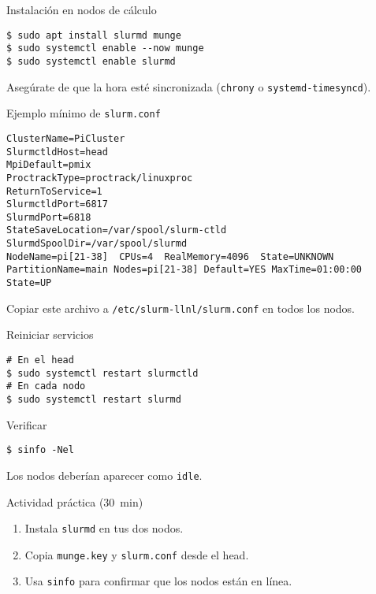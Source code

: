 \documentclass[aspectratio=169,professionalfonts]{beamer}
\begin{document}
\begin{frame}[fragile]{Instalación en nodos de cálculo}
  \begin{verbatim}
$ sudo apt install slurmd munge
$ sudo systemctl enable --now munge
$ sudo systemctl enable slurmd
  \end{verbatim}
  Asegúrate de que la hora esté sincronizada (\texttt{chrony} o \texttt{systemd‑timesyncd}).
\end{frame}

\begin{frame}[fragile]{Ejemplo mínimo de \texttt{slurm.conf}}
  \begin{verbatim}
ClusterName=PiCluster
SlurmctldHost=head
MpiDefault=pmix
ProctrackType=proctrack/linuxproc
ReturnToService=1
SlurmctldPort=6817
SlurmdPort=6818
StateSaveLocation=/var/spool/slurm-ctld
SlurmdSpoolDir=/var/spool/slurmd
NodeName=pi[21-38]  CPUs=4  RealMemory=4096  State=UNKNOWN
PartitionName=main Nodes=pi[21-38] Default=YES MaxTime=01:00:00 State=UP
  \end{verbatim}
  Copiar este archivo a \texttt{/etc/slurm‐llnl/slurm.conf} en todos los nodos.
\end{frame}

\begin{frame}[fragile]{Reiniciar servicios}
  \begin{verbatim}
# En el head
$ sudo systemctl restart slurmctld
# En cada nodo
$ sudo systemctl restart slurmd
  \end{verbatim}
  \begin{block}{Verificar}
    \begin{verbatim}
$ sinfo -Nel
    \end{verbatim}
  \end{block}
  Los nodos deberían aparecer como \texttt{idle}.
\end{frame}

\begin{frame}[fragile]{Actividad práctica (30 min)}
  \begin{enumerate}
    \item Instala \texttt{slurmd} en tus dos nodos.
    \item Copia \texttt{munge.key} y \texttt{slurm.conf} desde el head.
    \item Usa \texttt{sinfo} para confirmar que los nodos están en línea.
  \end{enumerate}
\end{frame}
\end{document}
